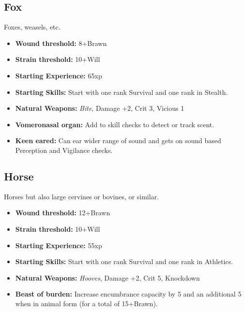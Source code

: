 \documentclass{book}
\begin{document}
\begin{multicols}{2}
	\subsection{Fox}	
	Foxes, weasels, etc.
	
	\begin{itemize}
		\item \textbf{Wound threshold:} 8+Brawn
		\item \textbf{Strain threshold:} 10+Will
		\item \textbf{Starting Experience:} 65xp
		\item \textbf{Starting Skills:} Start with one rank Survival and one rank in Stealth.
		\item \textbf{Natural Weapons:} \textit{Bite}, Damage +2, Crit 3, Vicious 1
		\item \textbf{Vomeronasal organ:} Add \BoostDie \BoostDie to skill checks to detect or track scent.
		\item \textbf{Keen eared:} Can ear wider range of sound and gets \BoostDie on sound based Perception and Vigilance checks.	
	\end{itemize}
	
	\subsection{Horse}
	Horses but also large cervines or bovines, or similar.
	
	\begin{itemize}
		\item \textbf{Wound threshold:} 12+Brawn
		\item \textbf{Strain threshold:} 10+Will
		\item \textbf{Starting Experience:} 55xp
		\item \textbf{Starting Skills:} Start with one rank Survival and one rank in Athletics.
		\item \textbf{Natural Weapons:} \textit{Hooves}, Damage +2, Crit 5, Knockdown
		\item \textbf{Beast of burden:} Increase encumbrance capacity by 5 and an additional 5 when in animal form (for a total of 15+Brawn).
	\end{itemize}
	
\end{multicols}
\end{document}

